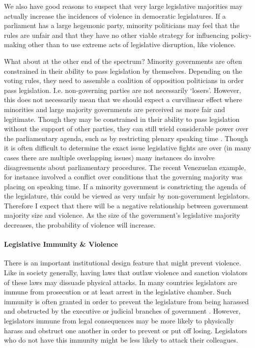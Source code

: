 \documentclass[a4paper]{article}\usepackage{graphicx, color}
\begin{document}
We also have good reasons to suspect that very large legislative majorities may actually increase the incidences of violence in democratic legislatures. If a parliament has a large hegemonic party, minority politicians may feel that the rules are unfair and that they have no other viable strategy for influencing policy-making other than to use extreme acts of legislative disruption, like violence.

What about at the other end of the spectrum? Minority governments are often constrained in their ability to pass legislation by themselves. Depending on the voting rules, they need to assemble a coalition of opposition politicians in order pass legislation. I.e. non-governing parties are not necessarily `losers'. However, this does not necessarily mean that we should expect a curvilinear effect where minorities and large majority governments are perceived as more fair and legitimate. Though they may be constrained in their ability to pass legislation without the support of other parties, they can still wield considerable power over the parliamentary agenda, such as by restricting plenary speaking time \citep{Tsebelis2002}. Though it is often difficult to determine the exact issue legislative fights are over (in many cases there are multiple overlapping issues) many instances do involve disagreements about parliamentary procedures. The recent Venezuelan example, for instance involved a conflict over conditions that the governing majority was placing on speaking time. If a minority government is constricting the agenda of the legislature, this could be viewed as very unfair by non-government legislators. Therefore I expect that there will be a negative relationship between government majority size and violence. As the size of the government's legislative majority decreases, the probability of violence will increase. 

\paragraph{Legislative Immunity \& Violence}

There is an important institutional design feature that might prevent violence. Like in society generally, having laws that outlaw violence and sanction violators of these laws may dissuade physical attacks. In many countries legislators are immune from prosecution or at least arrest in the legislative chamber. Such immunity is often granted in order to prevent the legislature from being harassed and obstructed by the executive or judicial branches of government  \citep{Seghetti1984}. However, legislators immune from legal consequences may be more likely to physically harass and obstruct one another in order to prevent or put off losing. Legislators who do not have this immunity might be less likely to attack their colleagues. 
\end{document}
